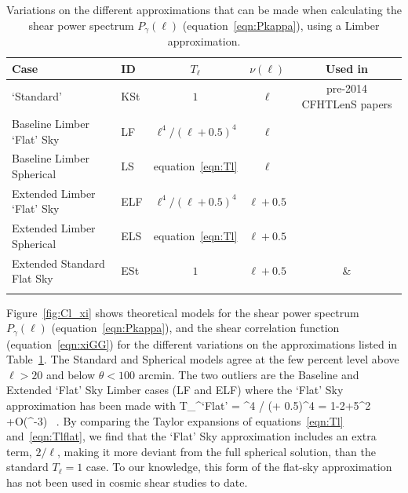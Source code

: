  \begin{table}%
\begin{center}
\begin{tabular}{ | l | l | c | c  | c |}
\hline
Case & ID & $T_\ell$ & $\nu(\ell)$ & Used in \\ \hline
\citet{kitching/etal:2016} `Standard' & KSt & $1$ & $\ell$ & pre-2014 CFHTLenS papers \\
Baseline Limber `Flat' Sky &  LF & $\ell^4 / (\ell + 0.5)^4$ & $\ell$ & \\
Baseline Limber Spherical & LS & equation~\ref{eqn:Tl} & $\ell$ & \\
Extended Limber `Flat' Sky & ELF & $\ell^4 / (\ell + 0.5)^4$ & $\ell + 0.5$ & \\
Extended Limber Spherical & ELS & equation~\ref{eqn:Tl}& $\ell + 0.5$  & \\
Extended Standard Flat Sky & ESt & $1$ & $\ell + 0.5$ & \citet{joudaki/etal:2016} \&  \\
  &  & & & \citet{hildebrandt/etal:2016}\\\hline
 \end{tabular}
 \end{center}
 \caption{\label{tab:Tl_nu}Variations on the different approximations that can be made when calculating the shear power spectrum $P_\gamma(\ell)$ (equation~\ref{eqn:Pkappa}), using a Limber approximation.} 
 \end{table}

Figure~\ref{fig:Cl_xi} shows theoretical models for the shear power spectrum $P_\gamma(\ell)$ (equation~\ref{eqn:Pkappa}), and the shear correlation function (equation~\ref{eqn:xiGG}) for the different variations on the approximations listed in Table~\ref{tab:Tl_nu}.   The Standard and Spherical models agree at the few percent level above $\ell>20$ and below $\theta< 100$ arcmin.  The two outliers are the Baseline and Extended `Flat' Sky Limber cases (LF and ELF) where the \citet{kitching/etal:2016} `Flat' Sky approximation has been made with
\be
T_\ell^{\rm `Flat'} = \ell^4 / (\ell + 0.5)^4 = 1-{2\over \ell}+{5\ell^2} +{\cal O}(\ell^{-3}) \, . 
\label{eqn:Tlflat}
\ee    
By comparing the Taylor expansions of equations~\ref{eqn:Tl} and~\ref{eqn:Tlflat}, we find that the \citet{kitching/etal:2016} `Flat' Sky approximation includes an extra term, $2/\ell$, making it more deviant from the full spherical solution, than the standard $T_\ell = 1$ case.    To our knowledge, this form of the flat-sky approximation has not been used in cosmic shear studies to date.  

